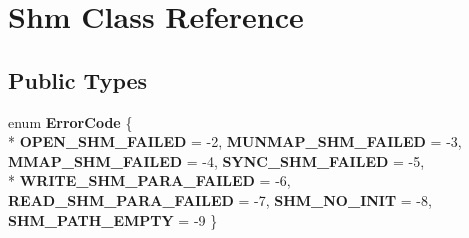 \hypertarget{class_shm}{\section{Shm Class Reference}
\label{class_shm}
}
\subsection*{Public Types}
\begin{DoxyCompactItemize}
\item 
enum {\bfseries Error\-Code} \{ \\*
{\bfseries O\-P\-E\-N\-\_\-\-S\-H\-M\-\_\-\-F\-A\-I\-L\-E\-D} = -\/2, 
{\bfseries M\-U\-N\-M\-A\-P\-\_\-\-S\-H\-M\-\_\-\-F\-A\-I\-L\-E\-D} = -\/3, 
{\bfseries M\-M\-A\-P\-\_\-\-S\-H\-M\-\_\-\-F\-A\-I\-L\-E\-D} = -\/4, 
{\bfseries S\-Y\-N\-C\-\_\-\-S\-H\-M\-\_\-\-F\-A\-I\-L\-E\-D} = -\/5, 
\\*
{\bfseries W\-R\-I\-T\-E\-\_\-\-S\-H\-M\-\_\-\-P\-A\-R\-A\-\_\-\-F\-A\-I\-L\-E\-D} = -\/6, 
{\bfseries R\-E\-A\-D\-\_\-\-S\-H\-M\-\_\-\-P\-A\-R\-A\-\_\-\-F\-A\-I\-L\-E\-D} = -\/7, 
{\bfseries S\-H\-M\-\_\-\-N\-O\-\_\-\-I\-N\-I\-T} = -\/8, 
{\bfseries S\-H\-M\-\_\-\-P\-A\-T\-H\-\_\-\-E\-M\-P\-T\-Y} = -\/9
 \}
\end{DoxyCompactItemize}
